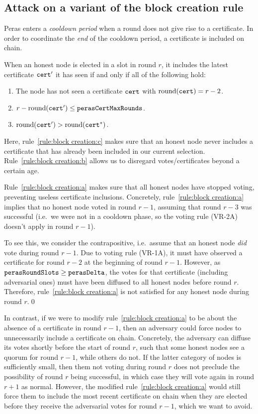 \subsection{Attack on a variant of the block creation rule}\label{sec:attack block creation rule}

Peras enters a \emph{cooldown period} when a round does not give rise to a certificate.
In order to coordinate the \emph{end} of the cooldown period, a certificate is included on chain.

When an honest node is elected in a slot in round $r$, it includes the latest certificate $\mathtt{cert}'$ it has seen if and only if all of the following hold:
\begin{enumerate}
\item\label{rule:block creation:a} The node has not seen a certificate $\mathtt{cert}$ with $\operatorname{round}(\mathtt{cert})=r-2$.
\item\label{rule:block creation:b} $r-\operatorname{round}(\mathtt{cert}') \le \mathtt{perasCertMaxRounds}$.
\item\label{rule:block creation:c} $\operatorname{round}(\mathtt{cert}') > \operatorname{round}(\mathtt{cert}^*)$.
\end{enumerate}
Here, rule~\ref{rule:block creation:c} makes sure that an honest node never includes a certificate that has already been included in our current selection.
Rule~\ref{rule:block creation:b} allows us to disregard votes/certificates beyond a certain age.

Rule~\ref{rule:block creation:a} makes sure that all honest nodes have stopped voting, preventing useless certificate inclusions.
Concretely, rule~\ref{rule:block creation:a} implies that no honest node voted in round $r-1$, assuming that round $r-3$ was successful (i.e.\ we were not in a cooldown phase, so the voting rule (VR-2A) doesn't apply in round $r-1$).

To see this, we consider the contrapositive, i.e.\ assume that an honest node \emph{did} vote during round $r-1$.
Due to voting rule (VR-1A), it must have observed a certificate for round $r-2$ at the beginning of round $r-1$.
However, as $\mathtt{perasRoundSlots}\ge\mathtt{perasDelta}$, the votes for that certificate (including adversarial ones) must have been diffused to all honest nodes before round $r$.
Therefore, rule~\ref{rule:block creation:a} is not satisfied for any honest node during round $r$.\qed{}

In contrast, if we were to modify rule~\ref{rule:block creation:a} to be about the absence of a certificate in round $r-1$, then an adversary could force nodes to unnecessarily include a certificate on chain.
Concretely, the adversary can diffuse its votes shortly before the start of round $r$, such that some honest nodes see a quorum for round $r-1$, while others do not.
If the latter category of nodes is sufficiently small, then them not voting during round $r$ does not preclude the possibility of round $r$ being successful, in which case they will vote again in round $r + 1$ as normal.
However, the modified rule~\ref{rule:block creation:a} would still force them to include the most recent certificate on chain when they are elected before they receive the adversarial votes for round $r-1$, which we want to avoid.

